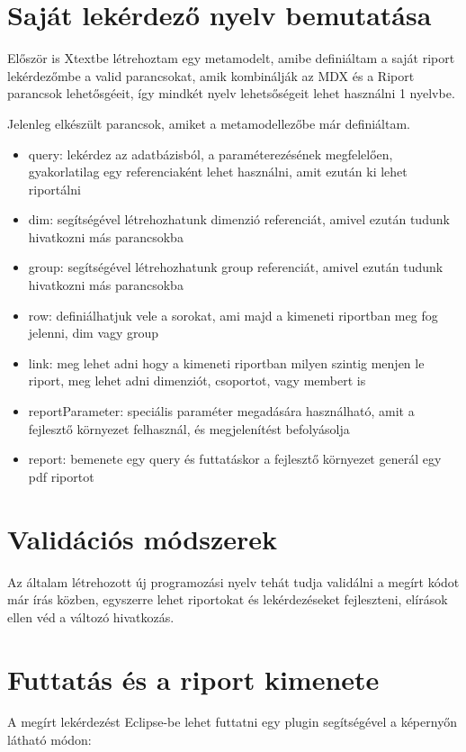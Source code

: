 \section{Saját lekérdező nyelv bemutatása}

Először is Xtextbe létrehoztam egy metamodelt, amibe definiáltam a saját riport
lekérdezőmbe a valid parancsokat, amik kombinálják az MDX és a Riport parancsok
lehetősgéeit, így mindkét nyelv lehetsőségeit lehet használni 1 nyelvbe.

Jelenleg elkészült parancsok, amiket a metamodellezőbe már definiáltam.
\begin{itemize}
  \item query: lekérdez az adatbázisból, a paraméterezésének megfelelően,
  gyakorlatilag egy referenciaként lehet használni, amit ezután ki lehet
  riportálni
  \item dim: segítségével létrehozhatunk dimenzió referenciát, amivel ezután
  tudunk hivatkozni más parancsokba
  \item group: segítségével létrehozhatunk group referenciát, amivel ezután
  tudunk hivatkozni más parancsokba
  \item row: definiálhatjuk vele a sorokat, ami majd a kimeneti riportban meg
  fog jelenni, dim vagy group
  \item link: meg lehet adni hogy a kimeneti riportban milyen szintig menjen le
  riport, meg lehet adni dimenziót, csoportot, vagy membert is
  \item reportParameter: speciális paraméter megadására használható, amit a
  fejlesztő környezet felhasznál, és megjelenítést befolyásolja
  \item report: bemenete egy query és futtatáskor a fejlesztő környezet generál
  egy pdf riportot 
\end{itemize}


\section{Validációs módszerek}
Az általam létrehozott új programozási nyelv tehát tudja validálni a megírt
kódot már írás közben, egyszerre lehet riportokat és lekérdezéseket fejleszteni,
elírások ellen véd a változó hivatkozás.

\section{Futtatás és a riport kimenete}
A megírt lekérdezést Eclipse-be lehet futtatni egy plugin segítségével a
képernyőn látható módon:

